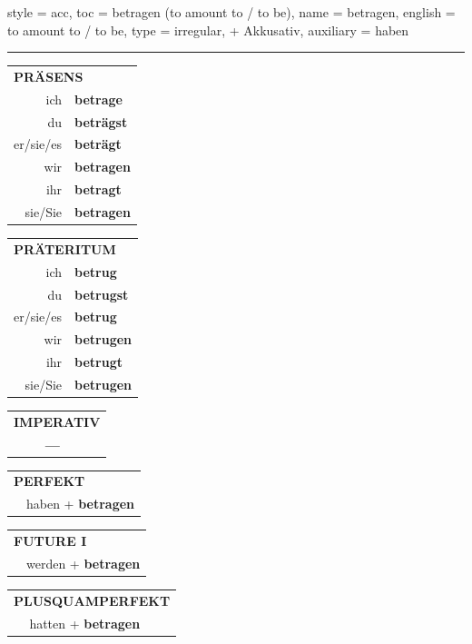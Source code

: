 \begin{verbentry}{
  style = {acc},
  toc = {betragen (to amount to / to be)},
  name = {betragen},
  english = {to amount to / to be},
  type = {irregular, + Akkusativ},
  auxiliary = {haben}
}


\vspace{5pt}
\hrule
\vspace{5pt}

\begin{tabular}{rl}
\multicolumn{2}{l}{\textbf{PRÄSENS}}\\
ich & \textbf{betrage}\\
du & \textbf{beträgst}\\
er/sie/es & \textbf{beträgt}\\
wir & \textbf{betragen}\\
ihr & \textbf{betragt}\\
sie/Sie & \textbf{betragen}\\
\end{tabular}
\hfill
\begin{tabular}{rl}
\multicolumn{2}{l}{\textbf{PRÄTERITUM}}\\
ich & \textbf{betrug}\\
du & \textbf{betrugst}\\
er/sie/es & \textbf{betrug}\\
wir & \textbf{betrugen}\\
ihr & \textbf{betrugt}\\
sie/Sie & \textbf{betrugen}\\
\end{tabular}
\hfill
\begin{tabular}{rl}
\multicolumn{2}{l}{\textbf{IMPERATIV}}\\
& \textbf{---}\\
\end{tabular}

\vspace{10pt}

\begin{tabular}{rl}
\multicolumn{2}{l}{\textbf{PERFEKT}}\\
& haben + \textbf{betragen}\\
\end{tabular}
\hfill
\begin{tabular}{rl}
\multicolumn{2}{l}{\textbf{FUTURE I}}\\
& werden + \textbf{betragen}\\
\end{tabular}
\hfill
\begin{tabular}{rl}
\multicolumn{2}{l}{\textbf{PLUSQUAMPERFEKT}}\\
& hatten + \textbf{betragen}\\
\end{tabular}


\end{verbentry}
